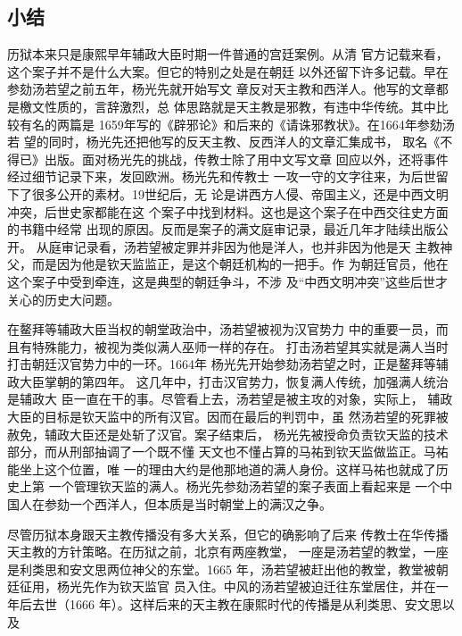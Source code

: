 \subsection{小结}
\par
历狱本来只是康熙早年辅政大臣时期一件普通的宫廷案例。从清%
官方记载来看，这个案子并不是什么大案。但它的特别之处是在朝廷%
以外还留下许多记载。早在参劾汤若望之前五年，杨光先就开始写文%
章反对天主教和西洋人。他写的文章都是檄文性质的，言辞激烈，总%
体思路就是天主教是邪教，有违中华传统。其中比较有名的两篇是%
1659年写的《辟邪论》和后来的《请诛邪教状》。在1664年参劾汤若%
望的同时，杨光先还把他写的反天主教、反西洋人的文章汇集成书，%
取名《不得已》出版。面对杨光先的挑战，传教士除了用中文写文章%
回应以外，还将事件经过细节记录下来，发回欧洲。杨光先和传教士%
一攻一守的文字往来，为后世留下了很多公开的素材。19世纪后，无%
论是讲西方人侵、帝国主义，还是中西文明冲突，后世史家都能在这%
个案子中找到材料。这也是这个案子在中西交往史方面的书籍中经常%
出现的原因。反而是案子的满文庭审记录，最近几年才陆续出版公开。%
从庭审记录看，汤若望被定罪并非因为他是洋人，也并非因为他是天%
主教神父，而是因为他是钦天监监正，是这个朝廷机构的一把手。作%
为朝廷官员，他在这个案子中受到牵连，这是典型的朝廷争斗，不涉%
及“中西文明冲突”这些后世才关心的历史大问题。%
\par
在鳌拜等辅政大臣当权的朝堂政治中，汤若望被视为汉官势力%
中的重要一员，而且有特殊能力，被视为类似满人巫师一样的存在。%
打击汤若望其实就是满人当时打击朝廷汉官势力中的一环。1664年%
杨光先开始参劾汤若望之时，正是鳌拜等辅政大臣掌朝的第四年。%
这几年中，打击汉官势力，恢复满人传统，加强满人统治是辅政大%
臣一直在干的事。尽管看上去，汤若望是被主攻的对象，实际上，%
辅政大臣的目标是钦天监中的所有汉官。因而在最后的判罚中，虽%
然汤若望的死罪被赦免，辅政大臣还是处斩了汉官。案子结束后，%
杨光先被授命负责钦天监的技术部分，而从刑部抽调了一个既不懂%
天文也不懂占算的马祐到钦天监做监正。马祐能坐上这个位置，唯%
一的理由大约是他那地道的满人身份。这样马祐也就成了历史上第%
一个管理钦天监的满人。杨光先参劾汤若望的案子表面上看起来是%
一个中国人在参劾一个西洋人，但本质是当时朝堂上的满汉之争。%
\par
尽管历狱本身跟天主教传播没有多大关系，但它的确影响了后来%
传教士在华传播天主教的方针策略。在历狱之前，北京有两座教堂，%
一座是汤若望的教堂，一座是利类思和安文思两位神父的东堂。1665%
年，汤若望被赶出他的教堂，教堂被朝廷征用，杨光先作为钦天监官%
员入住。中风的汤若望被迫迁往东堂居住，并在一年后去世（1666%
年）。这样后来的天主教在康熙时代的传播是从利类思、安文思以及%
